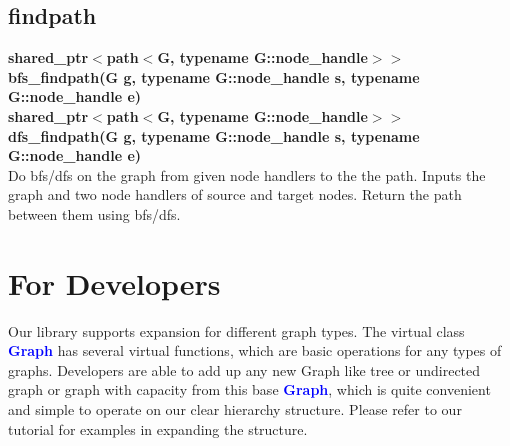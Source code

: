 \documentclass[]{article}
\begin{document}
\subsection{findpath}
\textbf{shared\_ptr$<$path$<$G, typename G::node\_handle$>>$ bfs\_findpath(G g, typename G::node\_handle s, typename G::node\_handle e)}\\
\textbf{shared\_ptr$<$path$<$G, typename G::node\_handle$>>$ dfs\_findpath(G g, typename G::node\_handle s, typename G::node\_handle e)}\\
Do bfs/dfs on the graph from given node handlers to the the path.
Inputs the graph and two node handlers of source and target nodes. Return the path between them using bfs/dfs.
\section{For Developers}
Our library supports expansion for different graph types. The virtual class \textbf{\textcolor{blue}{Graph}} has several virtual functions, which are basic operations for any types of graphs. Developers are able to add up any new Graph like tree or undirected graph or graph with capacity from this base \textbf{\textcolor{blue}{Graph}}, which is quite convenient and simple to operate on our clear hierarchy structure. Please refer to our tutorial for examples in expanding the structure.
\end{document}
